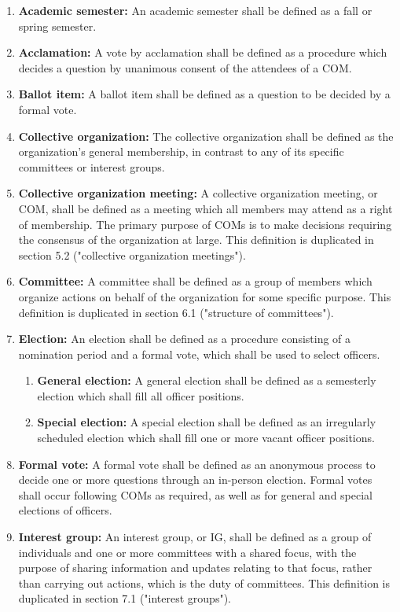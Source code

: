 \documentclass[11pt]{article}
\newcounter{h1}
\newcounter{h2}[h1]
\newcounter{h3}[h2]
\begin{document}

\begin{enumerate}
  \item \textbf{Academic semester:} An academic semester shall be defined as a fall or spring semester.  
  \item \textbf{Acclamation:} A vote by acclamation shall be defined as a procedure which decides a question by unanimous consent of the attendees of a COM.  
  \item \textbf{Ballot item:} A ballot item shall be defined as a question to be decided by a formal vote.  
  \item \textbf{Collective organization:} The collective organization shall be defined as the organization's general membership, in contrast to any of its specific committees or interest groups.  
  \item \textbf{Collective organization meeting:} A collective organization meeting, or COM, shall be defined as a meeting which all members may attend as a right of membership. The primary purpose of COMs is to make decisions requiring the consensus of the organization at large. This definition is duplicated in section 5.2 ("collective organization meetings").  
  \item \textbf{Committee:} A committee shall be defined as a group of members which organize actions on behalf of the organization for some specific purpose. This definition is duplicated in section 6.1 ("structure of committees").  
  \item \textbf{Election:} An election shall be defined as a procedure consisting of a nomination period and a formal vote, which shall be used to select officers.  
  \begin{enumerate}
    \item \textbf{General election:} A general election shall be defined as a semesterly election which shall fill all officer positions.  
    \item \textbf{Special election:} A special election shall be defined as an irregularly scheduled election which shall fill one or more vacant officer positions.  
  \end{enumerate}
  \item \textbf{Formal vote:} A formal vote shall be defined as an anonymous process to decide one or more questions through an in-person election. Formal votes shall occur following COMs as required, as well as for general and special elections of officers.  
  \item \textbf{Interest group:} An interest group, or IG, shall be defined as a group of individuals and one or more committees with a shared focus, with the purpose of sharing information and updates relating to that focus, rather than carrying out actions, which is the duty of committees. This definition is duplicated in section 7.1 ("interest groups").  

\end{enumerate}
\end{document}
